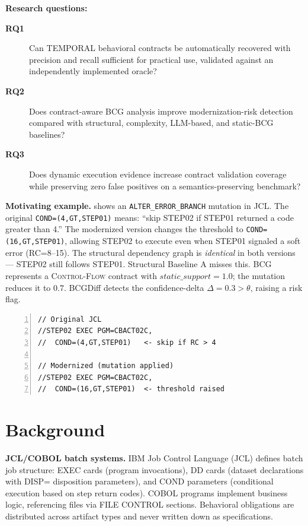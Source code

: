 \documentclass[sigconf,anonymous,review]{acmart}
\newcommand{\bcg}{\textsc{BCG}\xspace}
\begin{document}
\textbf{Research questions:}
\begin{description}
\item[\textbf{RQ1}] Can TEMPORAL behavioral contracts be automatically recovered
  with precision and recall sufficient for practical use, validated against an
  independently implemented oracle?
\item[\textbf{RQ2}] Does contract-aware BCG analysis improve modernization-risk
  detection compared with structural, complexity, LLM-based, and static-BCG
  baselines?
\item[\textbf{RQ3}] Does dynamic execution evidence increase contract validation
  coverage while preserving zero false positives on a semantics-preserving benchmark?
\end{description}

\textbf{Motivating example.}
 shows an \texttt{ALTER\_ERROR\_BRANCH} mutation in JCL.
The original \texttt{COND=(4,GT,STEP01)} means: ``skip STEP02 if STEP01 returned a
code greater than 4.''
The modernized version changes the threshold to \texttt{COND=(16,GT,STEP01)},
allowing STEP02 to execute even when STEP01 signaled a soft error (RC=8--15).
The structural dependency graph is \emph{identical} in both versions --- STEP02
still follows STEP01.
Structural Baseline A misses this.
\bcg represents a \textsc{Control-Flow} contract with
$\mathit{static\_support} = 1.0$; the mutation reduces it to $0.7$.
BCGDiff detects the confidence-delta $\Delta = 0.3 > \theta$, raising a risk flag.

\begin{lstlisting}[caption={Motivating example: ALTER\_ERROR\_BRANCH},
  label=lst:motivating, basicstyle=\small\ttfamily,
  frame=single, numbers=left]
// Original JCL
//STEP02 EXEC PGM=CBACT02C,
//  COND=(4,GT,STEP01)   <- skip if RC > 4

// Modernized (mutation applied)
//STEP02 EXEC PGM=CBACT02C,
//  COND=(16,GT,STEP01)  <- threshold raised
\end{lstlisting}

\section{Background}\label{sec:background}

\textbf{JCL/COBOL batch systems.}
IBM Job Control Language (JCL) defines batch job structure: EXEC cards (program
invocations), DD cards (dataset declarations with DISP= disposition parameters),
and COND parameters (conditional execution based on step return codes).
COBOL programs implement business logic, referencing files via FILE CONTROL sections.
Behavioral obligations are distributed across artifact types and never written down
as specifications.
\end{document}
